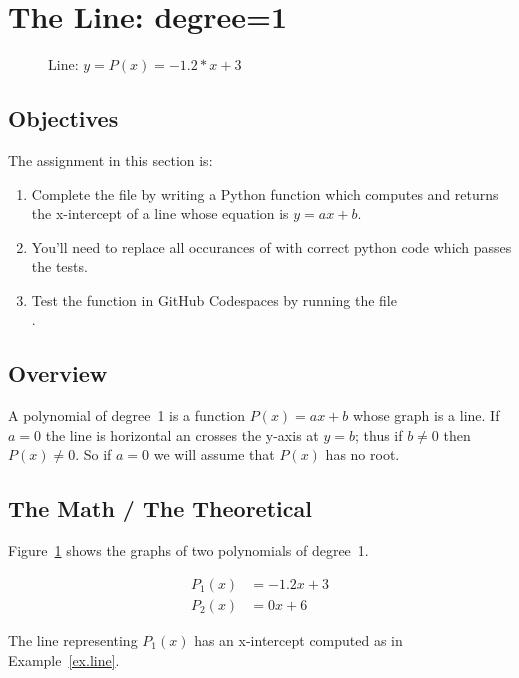 \section{The Line: degree=1}
\label{sec.line}

\begin{figure}
  \centering
  
  \caption{Line: $y = P(x) = -1.2*x + 3$}
  \label{fig.line}
\end{figure}


\subsection{Objectives}
The assignment in this section is:
\begin{enumerate}
\item Complete the file  by writing a Python
  function which computes and returns the x-intercept of a line whose
  equation is ${y=a x + b}$.
\item You'll need to replace all occurances of 
  with correct python code which passes the tests.

\item Test the function in GitHub Codespaces by running the file\\
  .
\end{enumerate}

\subsection{Overview}


A polynomial of degree~1 is a function $P(x)=a x + b$ whose graph is a line.   If $a=0$ the
line is horizontal an crosses the y-axis at $y=b$; thus if $b\neq 0$ then $P(x)\neq 0$.
So if $a=0$ we will assume that $P(x)$ has no root.   

\subsection{The Math / The Theoretical}


Figure~\ref{fig.line} shows the graphs of two polynomials of degree~1.

\begin{align*}
  P_1(x) &= -1.2 x + 3\\
  P_2(x) &= 0 x + 6
\end{align*}

The line representing $P_1(x)$ has an x-intercept computed as in Example~\ref{ex.line}.


